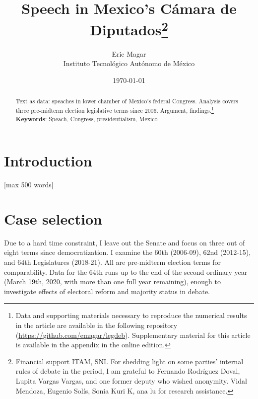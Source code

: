 \documentclass[letter,12pt]{article}
\begin{document}
\title{Speech in Mexico's Cámara de Diputados\thanks{Financial support ITAM, SNI. For shedding light on some parties' internal rules of debate in the period, I am grateful to Fernando Rodríguez Doval, Lupita Vargas Vargas, and one former deputy who wished anonymity. Vidal Mendoza, Eugenio Solís, Sonia Kuri K, ana lu for research assistance.}}
\author{Eric Magar \\ Instituto Tecnológico Autónomo de México}
\date{\today}
\maketitle

\newpage

\begin{abstract}
\noindent Text as data: speaches in lower chamber of Mexico's federal Congress. Analysis covers three pre-midterm election legislative terms since 2006. Argument, findings.\footnote{{Data and supporting materials necessary to reproduce the numerical results in the article are available in the following repository (\url{https://github.com/emagar/legdeb}). Supplementary material for this article is available in the appendix in the online edition.}}
\newline
\newline
\textbf{Keywords}: Speach, Congress, presidentialism, Mexico 
\end{abstract}

\newpage

\doublespacing

\section{Introduction} [max 500 words]

\section{Case selection}

Due to a hard time constraint, I leave out the Senate and focus on three out of eight terms since democratization. I examine the 60th (2006-09), 62nd (2012-15), and 64th Legislatures (2018-21). All are pre-midterm election terms for comparability. Data for the 64th runs up to the end of the second ordinary year (March 19th, 2020, with more than one full year remaining), enough to investigate effects of electoral reform and majority status in debate. 
\end{document}
